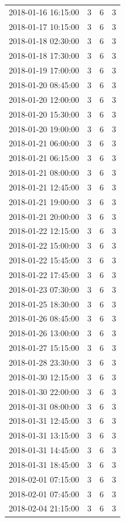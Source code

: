 \begin{tabular}{lrrr}
2018-01-16 16:15:00 & 3 & 6 & 3 \\
2018-01-17 10:15:00 & 3 & 6 & 3 \\
2018-01-18 02:30:00 & 3 & 6 & 3 \\
2018-01-18 17:30:00 & 3 & 6 & 3 \\
2018-01-19 17:00:00 & 3 & 6 & 3 \\
2018-01-20 08:45:00 & 3 & 6 & 3 \\
2018-01-20 12:00:00 & 3 & 6 & 3 \\
2018-01-20 15:30:00 & 3 & 6 & 3 \\
2018-01-20 19:00:00 & 3 & 6 & 3 \\
2018-01-21 06:00:00 & 3 & 6 & 3 \\
2018-01-21 06:15:00 & 3 & 6 & 3 \\
2018-01-21 08:00:00 & 3 & 6 & 3 \\
2018-01-21 12:45:00 & 3 & 6 & 3 \\
2018-01-21 19:00:00 & 3 & 6 & 3 \\
2018-01-21 20:00:00 & 3 & 6 & 3 \\
2018-01-22 12:15:00 & 3 & 6 & 3 \\
2018-01-22 15:00:00 & 3 & 6 & 3 \\
2018-01-22 15:45:00 & 3 & 6 & 3 \\
2018-01-22 17:45:00 & 3 & 6 & 3 \\
2018-01-23 07:30:00 & 3 & 6 & 3 \\
2018-01-25 18:30:00 & 3 & 6 & 3 \\
2018-01-26 08:45:00 & 3 & 6 & 3 \\
2018-01-26 13:00:00 & 3 & 6 & 3 \\
2018-01-27 15:15:00 & 3 & 6 & 3 \\
2018-01-28 23:30:00 & 3 & 6 & 3 \\
2018-01-30 12:15:00 & 3 & 6 & 3 \\
2018-01-30 22:00:00 & 3 & 6 & 3 \\
2018-01-31 08:00:00 & 3 & 6 & 3 \\
2018-01-31 12:45:00 & 3 & 6 & 3 \\
2018-01-31 13:15:00 & 3 & 6 & 3 \\
2018-01-31 14:45:00 & 3 & 6 & 3 \\
2018-01-31 18:45:00 & 3 & 6 & 3 \\
2018-02-01 07:15:00 & 3 & 6 & 3 \\
2018-02-01 07:45:00 & 3 & 6 & 3 \\
2018-02-04 21:15:00 & 3 & 6 & 3 \\

\end{tabular}

